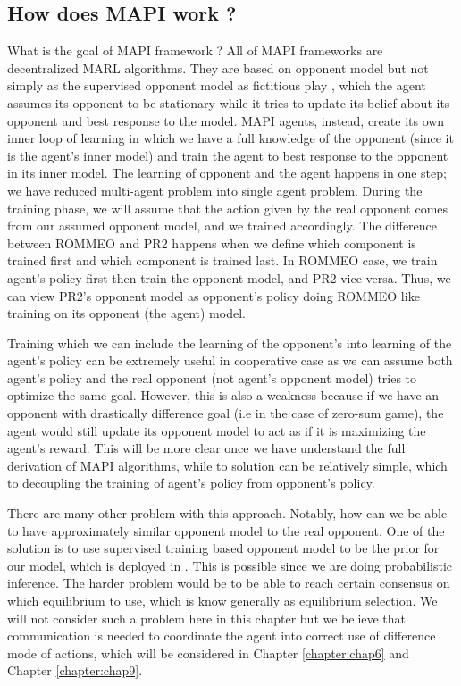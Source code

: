 \label{sec:chap3-intro-MAPI}

\subsection{How does MAPI work ?}

What is the goal of MAPI framework ? All of MAPI frameworks are decentralized MARL algorithms. They are based on opponent model but not simply as the supervised opponent model as fictitious play \cite{berger2007brown}, which the agent assumes its opponent to be stationary while it tries to update its belief about its opponent and best response to the model. MAPI agents, instead, create its own inner loop of learning in which we have a full knowledge of the opponent (since it is the agent's inner model) and train the agent to best response to the opponent in its inner model. The learning of opponent and the agent happens in one step; we have reduced multi-agent problem into single agent problem. During the training phase, we will assume that the action given by the real opponent comes from our assumed opponent model, and we trained accordingly. The difference between ROMMEO \cite{tian2019regularized} and PR2 \cite{wen2019probabilistic} happens when we define which component is trained first and which component is trained last. In ROMMEO case, we train agent's policy first then train the opponent model, and PR2 vice versa. Thus, we can view PR2's opponent model as opponent's policy doing ROMMEO like training on its opponent (the agent) model. 

Training which we can include the learning of the opponent's into learning of the agent's policy can be extremely useful in cooperative case as we can assume both agent's policy and the real opponent (not agent's opponent model) tries to optimize the same goal. However, this is also a weakness because if we have an opponent with drastically difference goal (i.e in the case of zero-sum game), the agent would still update its opponent model to act as if it is maximizing the agent's reward. This will be more clear once we have understand the full derivation of MAPI algorithms, while to solution can be relatively simple, which to decoupling the training of agent's policy from opponent's policy.

There are many other problem with this approach. Notably, how can we be able to have approximately similar opponent model to the real opponent. One of the solution is to use supervised training based opponent model to be the prior for our model, which is deployed in \cite{tian2019regularized}. This is possible since we are doing probabilistic inference. The harder problem would be to be able to reach certain consensus on which equilibrium to use, which is know generally as equilibrium selection. We will not consider such a problem here in this chapter but we believe that communication is needed to coordinate the agent into correct use of difference mode of actions, which will be considered in Chapter \ref{chapter:chap6} and Chapter \ref{chapter:chap9}.

